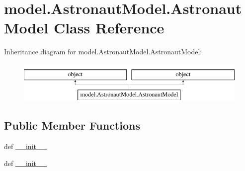 \hypertarget{classmodel_1_1AstronautModel_1_1AstronautModel}{}\section{model.\+Astronaut\+Model.\+Astronaut\+Model Class Reference}
\label{classmodel_1_1AstronautModel_1_1AstronautModel}
Inheritance diagram for model.\+Astronaut\+Model.\+Astronaut\+Model\+:\begin{figure}[H]
\begin{center}
\leavevmode
\includegraphics[height=2.000000cm]{classmodel_1_1AstronautModel_1_1AstronautModel}
\end{center}
\end{figure}
\subsection*{Public Member Functions}
\begin{DoxyCompactItemize}
\item 
def \hyperlink{classmodel_1_1AstronautModel_1_1AstronautModel_acf57c389f77b47f834fd3e2959f058d9}{\+\_\+\+\_\+init\+\_\+\+\_\+}
\item 
def \hyperlink{classmodel_1_1AstronautModel_1_1AstronautModel_acf57c389f77b47f834fd3e2959f058d9}{\+\_\+\+\_\+init\+\_\+\+\_\+}
\end{DoxyCompactItemize}
